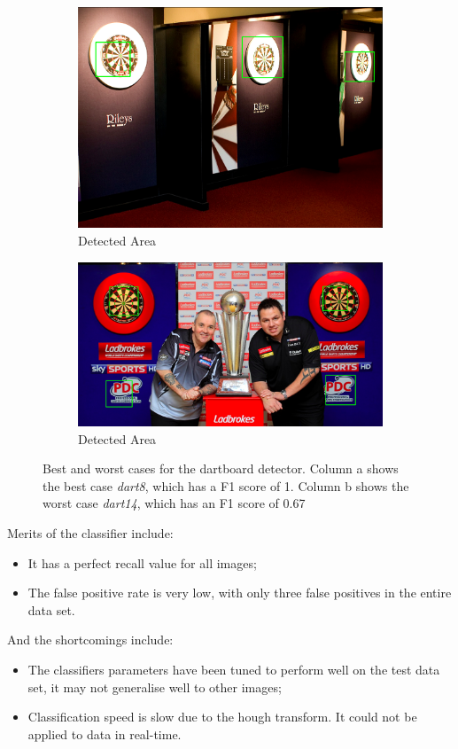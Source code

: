 \documentclass[conference]{IEEEtran}
\begin{document}
\begin{figure}[htb]
\begin{subfigure}{.5\linewidth}
\vspace{0.3cm}
  \centering
  \includegraphics[width=.9\linewidth]{images/task3/bestresult.png}
  \caption{Detected Area}
  \label{fig:sub1}
\end{subfigure}%
\begin{subfigure}{.5\linewidth}
\vspace{1.1cm}
  \centering
  \includegraphics[width=.9\linewidth]{images/task3/worstresult.png}
  \caption{Detected Area}
  \label{fig:sub2}
\end{subfigure}
\caption{Best and worst cases for the dartboard detector. Column a shows the best case \emph{dart8}, which has a F1 score of 1.  Column b shows the worst case \emph{dart14}, which has an F1 score of 0.67}
\end{figure}


Merits of the classifier include: 
\begin{itemize}
	\item It has a perfect recall value for all images;
	\item The false positive rate is very low, with only three false positives in the entire data set.
\end{itemize}
And the shortcomings include:
\begin{itemize}
	\item The classifiers parameters have been tuned to perform well on the test data set, it may not generalise well to other images;
	\item Classification speed is slow due to the hough transform. It could not be applied to data in real-time. 
\end{itemize}
\end{document}
